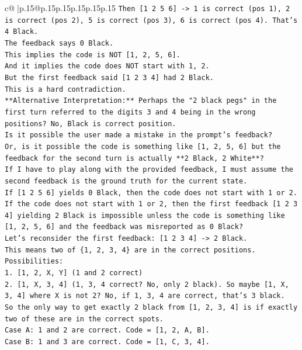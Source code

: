 \documentclass{article}
\begin{document}
{\begin{supertabular}{c@{$\;$}|p{.15\linewidth}@{}p{.15\linewidth}p{.15\linewidth}p{.15\linewidth}p{.15\linewidth}p{.15\linewidth}}
{{{\texttt{Then {[}1 2 5 6{]} {-}> 1 is correct (pos 1), 2 is correct (pos 2), 5 is correct (pos 3), 6 is correct (pos 4). That's 4 Black.} \\
\texttt{The feedback says 0 Black.} \\
\texttt{This implies the code is NOT {[}1, 2, 5, 6{]}.} \\
\texttt{And it implies the code does NOT start with 1, 2.} \\
\texttt{But the first feedback said {[}1 2 3 4{]} had 2 Black.} \\
\texttt{This is a hard contradiction.} \\
\texttt{**Alternative Interpretation:** Perhaps the "2 black pegs" in the first turn referred to the digits 3 and 4 being in the wrong positions? No, Black is correct position.} \\
\texttt{Is it possible the user made a mistake in the prompt's feedback?} \\
\texttt{Or, is it possible the code is something like {[}1, 2, 5, 6{]} but the feedback for the second turn is actually **2 Black, 2 White**?} \\
\texttt{If I have to play along with the provided feedback, I must assume the second feedback is the ground truth for the current state.} \\
\texttt{If {[}1 2 5 6{]} yields 0 Black, then the code does not start with 1 or 2.} \\
\texttt{If the code does not start with 1 or 2, then the first feedback {[}1 2 3 4{]} yielding 2 Black is impossible unless the code is something like {[}1, 2, 5, 6{]} and the feedback was misreported as 0 Black?} \\
\texttt{Let's reconsider the first feedback: {[}1 2 3 4{]} {-}> 2 Black.} \\
\texttt{This means two of \{1, 2, 3, 4\} are in the correct positions.} \\
\texttt{Possibilities:} \\
\texttt{1. {[}1, 2, X, Y{]} (1 and 2 correct)} \\
\texttt{2. {[}1, X, 3, 4{]} (1, 3, 4 correct? No, only 2 black). So maybe {[}1, X, 3, 4{]} where X is not 2? No, if 1, 3, 4 are correct, that's 3 black.} \\
\texttt{So the only way to get exactly 2 black from {[}1, 2, 3, 4{]} is if exactly two of these are in the correct spots.} \\
\texttt{Case A: 1 and 2 are correct. Code = {[}1, 2, A, B{]}.} \\
\texttt{Case B: 1 and 3 are correct. Code = {[}1, C, 3, 4{]}.} \\
}}}
\end{supertabular}}
\end{document}
